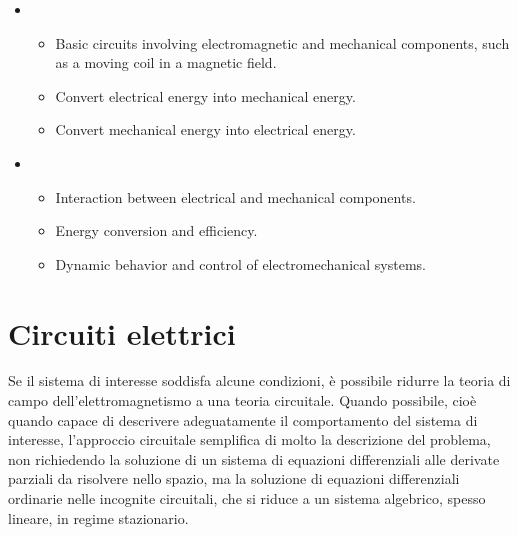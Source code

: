 \documentclass[letterpaper,10pt,english]{jupyterBook}
\begin{document}
\sphinxAtStartPar
{}
\begin{itemize}
\item {} 
\sphinxAtStartPar
{}
\begin{itemize}
\item {} 
\sphinxAtStartPar
{} Basic circuits involving electromagnetic and mechanical components, such as a moving coil in a magnetic field.

\item {} 
\sphinxAtStartPar
{} Convert electrical energy into mechanical energy.

\item {} 
\sphinxAtStartPar
{} Convert mechanical energy into electrical energy.

\end{itemize}

\item {} 
\sphinxAtStartPar
{}
\begin{itemize}
\item {} 
\sphinxAtStartPar
Interaction between electrical and mechanical components.

\item {} 
\sphinxAtStartPar
Energy conversion and efficiency.

\item {} 
\sphinxAtStartPar
Dynamic behavior and control of electromechanical systems.

\end{itemize}

\end{itemize}

\sphinxstepscope




\section{Circuiti elettrici}
\label{\detokenize{ch/circuits-electric:circuiti-elettrici}}\label{\detokenize{ch/circuits-electric:classical-electromagnetism-circuits-electric}}\label{\detokenize{ch/circuits-electric::doc}}
\sphinxAtStartPar
Se il sistema di interesse soddisfa alcune condizioni, è possibile ridurre la teoria di campo dell’elettromagnetismo a una teoria circuitale.
Quando possibile, cioè quando capace di descrivere adeguatamente il comportamento del sistema di interesse, l’approccio circuitale semplifica di molto la descrizione del problema, non richiedendo la soluzione di un sistema di equazioni differenziali alle derivate parziali da risolvere nello spazio, ma la soluzione di equazioni differenziali ordinarie nelle incognite circuitali, che si riduce a un sistema algebrico, spesso lineare, in regime stazionario.
\end{document}
